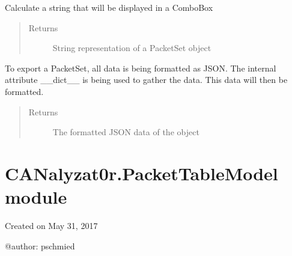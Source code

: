 \documentclass[letterpaper,10pt,english]{sphinxmanual}
\begin{document}
\begin{fulllineitems}
\begin{fulllineitems}
\end{fulllineitems}


\begin{fulllineitems}
\label{\detokenize{src:src.PacketSet.PacketSet.toComboBoxString}}
Calculate a string that will be displayed in a ComboBox
\begin{quote}\begin{description}
\item[{Returns}] \leavevmode
String representation of a PacketSet object

\end{description}\end{quote}

\end{fulllineitems}


\begin{fulllineitems}
\label{\detokenize{src:src.PacketSet.PacketSet.toJSON}}
To export a PacketSet, all data is being formatted as JSON.
The internal attribute \_\_dict\_\_ is being used to gather the data.
This data will then be formatted.
\begin{quote}\begin{description}
\item[{Returns}] \leavevmode
The formatted JSON data of the object

\end{description}\end{quote}

\end{fulllineitems}


\end{fulllineitems}



\section{CANalyzat0r.PacketTableModel module}
\label{\detokenize{src:module-src.PacketTableModel}}\label{\detokenize{src:canalyzat0r-packettablemodel-module}}
Created on May 31, 2017

@author: pschmied
\end{document}
